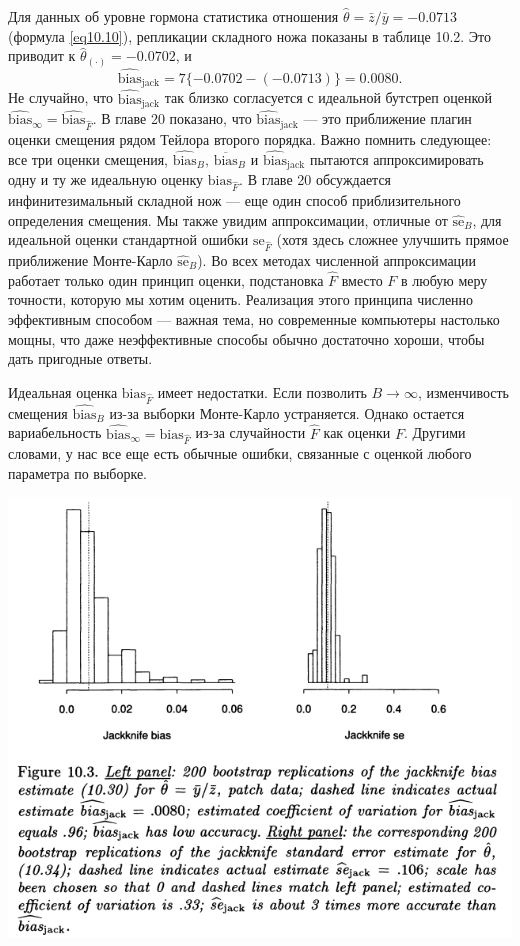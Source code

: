 Для данных об уровне гормона статистика отношения $\hat{\theta} = \bar{z}/\bar{y} = -0.0713$ (формула \ref{eq10.10}), репликации складного ножа показаны в таблице 10.2. Это приводит к $\hat{\theta}_{(\cdot)} = -0.0702$, и
\begin{equation}\label{eq10.32}
    \widehat{\text{bias}}_{\text{jack}} = 7\{-0.0702 - ( -0.0713)\} = 0.0080.
\end{equation}
Не случайно, что $\widehat{\text{bias}}_{\text{jack}}$ так близко согласуется с идеальной бутстреп оценкой $\widehat{\text{bias}}_{\infty} = \widehat{\text{bias}}_{\hat{F}}$. В главе 20 показано, что $\widehat{\text{bias}}_{\text{jack}}$ --- это приближение плагин оценки смещения рядом Тейлора второго порядка. Важно помнить следующее: все три оценки смещения, $\widehat{\text{bias}}_{B},\, \overline{\text{bias}}_{B}$ и $\widehat{\text{bias}}_{\text{jack}}$ пытаются аппроксимировать одну и ту же идеальную оценку $\text{bias}_{\hat{F}}$. В главе 20 обсуждается инфинитезимальный складной нож --- еще один способ приблизительного определения смещения. Мы также увидим аппроксимации, отличные от $\widehat{\text{se}}_{B}$, для идеальной оценки стандартной ошибки $\text{se}_{\hat{F}}$ (хотя здесь сложнее улучшить прямое приближение Монте-Карло $\widehat{\text{se}}_{B}$). Во всех методах численной аппроксимации работает только один принцип оценки, подстановка $\hat{F}$ вместо $F$ в любую меру точности, которую мы хотим оценить. Реализация этого принципа численно эффективным способом --- важная тема, но современные компьютеры настолько мощны, что даже неэффективные способы обычно достаточно хороши, чтобы дать пригодные ответы.

Идеальная оценка $\text{bias}_{\hat{F}}$ имеет недостатки. Если позволить $B \rightarrow \infty$, изменчивость смещения $\widehat{\text{bias}}_{B}$ из-за выборки Монте-Карло устраняется. Однако остается вариабельность $\widehat{\text{bias}}_{\infty} = \text{bias}_{\hat{F}}$ из-за случайности $\hat{F}$ как оценки $F$. Другими словами, у нас все еще есть обычные ошибки, связанные с оценкой любого параметра по выборке.

\noindent
\includegraphics[width=\linewidth]{10/f10.3.png}

